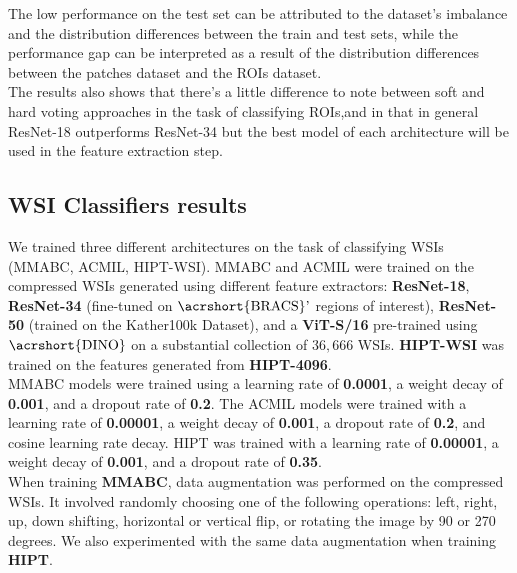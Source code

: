 \documentclass[
11pt, %
english, %
singlespacing, %
headsepline, %
]{project_structure}
\begin{document}
\noindent The low performance on the test set can be attributed to the dataset's imbalance and the distribution differences between the train and test sets, while the performance gap can be interpreted as a result of the distribution differences between the patches dataset and the \acrshort{ROI}s dataset.\\

\noindent The results also shows that there's a little difference to note between soft and hard voting approaches in the task of classifying \acrshort{ROI}s,and in that in general \acrshort{ResNet}-18 outperforms \acrshort{ResNet}-34 but the best model of each architecture will be used in the feature extraction step. 

\subsection{\acrshort{WSI} Classifiers results}

\noindent We trained three different architectures on the task of classifying \acrshort{WSI}s (\acrshort{MMABC}, \acrshort{ACMIL}, \acrshort{HIPT}-\acrshort{WSI}). \acrshort{MMABC} and \acrshort{ACMIL} were trained on the compressed \acrshort{WSI}s generated using different feature extractors: \textbf{\acrshort{ResNet}-18}, \textbf{\acrshort{ResNet}-34} (fine-tuned on $\text{\acrshort{BRACS}'}$ regions of interest), \textbf{\acrshort{ResNet}-50} (trained on the Kather100k Dataset), and a \textbf{ViT-S/16} pre-trained using $\text{\acrshort{DINO}}$ on a substantial collection of $36,666$ \acrshort{WSI}s. \textbf{\acrshort{HIPT}-\acrshort{WSI}} was trained on the features generated from \textbf{\acrshort{HIPT}-4096}.\\

\noindent \acrshort{MMABC} models were trained using a learning rate of \textbf{0.0001}, a weight decay of \textbf{0.001}, and a dropout rate of \textbf{0.2}. The \acrshort{ACMIL} models were trained with a learning rate of \textbf{0.00001}, a weight decay of \textbf{0.001}, a dropout rate of \textbf{0.2}, and cosine learning rate decay. \acrshort{HIPT} was trained with a learning rate of \textbf{0.00001}, a weight decay of \textbf{0.001}, and a dropout rate of \textbf{0.35}.\\

\noindent When training \textbf{\acrshort{MMABC}}, data augmentation was performed on the compressed \acrshort{WSI}s. It involved randomly choosing one of the following operations: left, right, up, down shifting, horizontal or vertical flip, or rotating the image by 90 or 270 degrees. We also experimented with the same data augmentation when training \textbf{\acrshort{HIPT}}.\\
\end{document}
